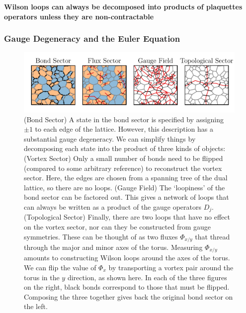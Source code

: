 \textbf{Wilson loops can always be decomposed into products of plaquettes operators unless they are non-contractable}

\hypertarget{gauge-degeneracy-and-the-euler-equation}{%
\subsubsection{Gauge Degeneracy and the Euler Equation}\label{gauge-degeneracy-and-the-euler-equation}}

\begin{figure}
\hypertarget{fig:state_decomposition_animated}{%
\centering
\includegraphics[width=1.14\textwidth,height=\textheight]{figure_code/amk_chapter/state_decomposition_animated/state_decomposition_animated.pdf}
\caption{(Bond Sector) A state in the bond sector is specified by assigning \(\pm 1\) to each edge of the lattice. However, this description has a substantial gauge degeneracy. We can simplify things by decomposing each state into the product of three kinds of objects: (Vortex Sector) Only a small number of bonds need to be flipped (compared to some arbitrary reference) to reconstruct the vortex sector. Here, the edges are chosen from a spanning tree of the dual lattice, so there are no loops. (Gauge Field) The `loopiness' of the bond sector can be factored out. This gives a network of loops that can always be written as a product of the gauge operators \(D_j\). (Topological Sector) Finally, there are two loops that have no effect on the vortex sector, nor can they be constructed from gauge symmetries. These can be thought of as two fluxes \(\Phi_{x/y}\) that thread through the major and minor axes of the torus. Measuring \(\Phi_{x/y}\) amounts to constructing Wilson loops around the axes of the torus. We can flip the value of \(\Phi_{x}\) by transporting a vortex pair around the torus in the \(y\) direction, as shown here. In each of the three figures on the right, black bonds correspond to those that must be flipped. Composing the three together gives back the original bond sector on the left.}\label{fig:state_decomposition_animated}
}
\end{figure}

